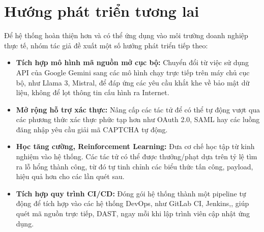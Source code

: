 \section*{Hướng phát triển tương lai}
Để hệ thống hoàn thiện hơn và có thể ứng dụng vào môi trường doanh nghiệp thực tế, nhóm tác giả đề xuất một số hướng phát triển tiếp theo:
\begin{itemize}
    \item \textbf{Tích hợp mô hình mã nguồn mở cục bộ:} Chuyển đổi từ việc sử dụng API của Google Gemini sang các mô hình chạy trực tiếp trên máy chủ cục bộ, như Llama 3, Mistral, để đáp ứng các yêu cầu khắt khe về bảo mật dữ liệu, không để lọt thông tin cấu hình ra Internet.
    \item \textbf{Mở rộng hỗ trợ xác thực:} Nâng cấp các tác tử để có thể tự động vượt qua các phương thức xác thực phức tạp hơn như OAuth 2.0, SAML hay các luồng đăng nhập yêu cầu giải mã CAPTCHA tự động.
    \item \textbf{Học tăng cường, Reinforcement Learning:} Đưa cơ chế học tập từ kinh nghiệm vào hệ thống. Các tác tử có thể được thưởng/phạt dựa trên tỷ lệ tìm ra lỗ hổng thành công, từ đó tự tinh chỉnh các biểu thức tấn công, payload, hiệu quả hơn cho các lần quét sau.
    \item \textbf{Tích hợp quy trình CI/CD:} Đóng gói hệ thống thành một pipeline tự động để tích hợp vào các hệ thống DevOps, như GitLab CI, Jenkins,, giúp quét mã nguồn trực tiếp, DAST, ngay mỗi khi lập trình viên cập nhật ứng dụng.
\end{itemize}